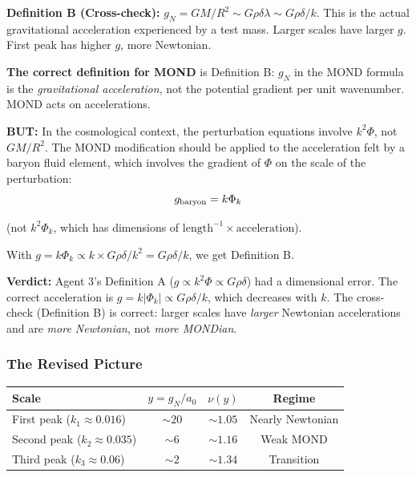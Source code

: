 \documentclass[11pt,a4paper]{article}
\begin{document}
\textbf{Definition B (Cross-check):} $g_N = GM/R^2 \sim G\rho\delta\lambda \sim G\rho\delta/k$. This is the actual gravitational acceleration experienced by a test mass. Larger scales have larger $g$. First peak has higher $g$, more Newtonian.

\textbf{The correct definition for MOND} is Definition B: $g_N$ in the MOND formula is the \emph{gravitational acceleration}, not the potential gradient per unit wavenumber. MOND acts on accelerations.

\textbf{BUT:} In the cosmological context, the perturbation equations involve $k^2\Phi$, not $GM/R^2$. The MOND modification should be applied to the acceleration felt by a baryon fluid element, which involves the gradient of $\Phi$ on the scale of the perturbation:
\begin{equation}
g_{\rm baryon} = k\Phi_k
\end{equation}

(not $k^2\Phi_k$, which has dimensions of $\text{length}^{-1}\times\text{acceleration}$).

With $g = k\Phi_k \propto k \times G\rho\delta/k^2 = G\rho\delta/k$, we get Definition B.

\textbf{Verdict:} Agent 3's Definition A ($g \propto k^2\Phi \propto G\rho\delta$) had a dimensional error. The correct acceleration is $g = k|\Phi_k| \propto G\rho\delta/k$, which decreases with $k$. The cross-check (Definition B) is correct: larger scales have \emph{larger} Newtonian accelerations and are \emph{more Newtonian}, not \emph{more MONDian}.

\subsubsection{The Revised Picture}

\begin{center}
\begin{tabular}{lccc}
\toprule
\textbf{Scale} & \textbf{$y = g_N/a_0$} & \textbf{$\nu(y)$} & \textbf{Regime} \\
\midrule
First peak ($k_1 \approx 0.016$) & $\sim 20$ & $\sim 1.05$ & Nearly Newtonian \\
Second peak ($k_2 \approx 0.035$) & $\sim 6$ & $\sim 1.16$ & Weak MOND \\
Third peak ($k_3 \approx 0.06$) & $\sim 2$ & $\sim 1.34$ & Transition \\
\bottomrule
\end{tabular}
\end{center}
\end{document}
